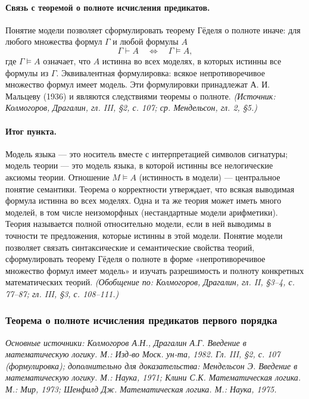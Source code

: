 \documentclass[a4paper,12pt]{article}
\begin{document}
\paragraph{Связь с теоремой о полноте исчисления предикатов.} Понятие модели позволяет сформулировать теорему Гёделя о полноте иначе: для любого множества формул \(\Gamma\) и любой формулы \(A\)
\[
\Gamma\vdash A\quad\Longleftrightarrow\quad\Gamma\models A,
\]
где \(\Gamma\models A\) означает, что \(A\) истинна во всех моделях, в которых истинны все формулы из \(\Gamma\). Эквивалентная формулировка: всякое непротиворечивое множество формул имеет модель. Эти формулировки принадлежат А. И. Мальцеву (1936) и являются следствиями теоремы о полноте.
\textit{(Источник: Колмогоров, Драгалин, гл. III, §2, с. 107; ср. Мендельсон, гл. 2, §5.)}

\paragraph{Итог пункта.} Модель языка --- это носитель вместе с интерпретацией символов сигнатуры; модель теории --- это модель языка, в которой истинны все нелогические аксиомы теории. Отношение \(M\models A\) (истинность в модели) --- центральное понятие семантики. Теорема о корректности утверждает, что всякая выводимая формула истинна во всех моделях. Одна и та же теория может иметь много моделей, в том числе неизоморфных (нестандартные модели арифметики). Теория называется полной относительно модели, если в ней выводимы в точности те предложения, которые истинны в этой модели. Понятие модели позволяет связать синтаксические и семантические свойства теорий, сформулировать теорему Гёделя о полноте в форме «непротиворечивое множество формул имеет модель» и изучать разрешимость и полноту конкретных математических теорий.
\textit{(Обобщение по: Колмогоров, Драгалин, гл. II, §3--4, с. 77--87; гл. III, §3, с. 108--111.)}

\subsubsection{Теорема о полноте исчисления предикатов первого порядка}

\noindent\textit{Основные источники: Колмогоров А.Н., Драгалин А.Г. Введение в математическую логику. М.: Изд-во Моск. ун-та, 1982. Гл. III, §2, с. 107 (формулировка); дополнительно для доказательства: Мендельсон Э. Введение в математическую логику. М.: Наука, 1971; Клини С.К. Математическая логика. М.: Мир, 1973; Шенфилд Дж. Математическая логика. М.: Наука, 1975.}
\end{document}

